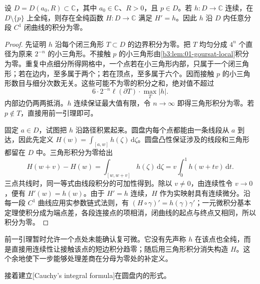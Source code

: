 \begin{lemma}\label{b3:lem:01-punctured-primitive}
设 \(D=D(a_0,R)\subset\mathbb C\)，其中 \(a_0\in\mathbb C\)、\(R>0\)，且 \(p\in D\)。若 \(h:D\to\mathbb C\) 连续，在 \(D\setminus\{p\}\) 上全纯，则存在全纯函数 \(H:D\to\mathbb C\) 满足 \(H'=h\)。因此 \(h\) 沿 \(D\) 内任意分段 \(C^1\) 闭曲线的积分为零。
\end{lemma}
\begin{proof}
先证明 \(h\) 沿每个闭三角形 \(T\subset D\) 的边界积分为零。把 \(T\) 均匀分成 \(4^n\) 个直径为原来 \(2^{-n}\) 的小三角形。不接触 \(p\) 的小三角形由\cref{b3:lem:01-goursat-local}积分为零。重复中点细分所得网格中，一个点若在小三角形内部，只属于一个闭三角形；若在边内，至多属于两个；若在顶点，至多属于六个。因而接触 \(p\) 的小三角形数目与细分次数无关。这些可能不为零的积分之和，绝对值不超过
\[
6\cdot2^{-n}\ell(\partial T)\cdot\max_T|h|.
\]
内部边仍两两抵消。\(h\) 连续保证最大值有限，令 \(n\to\infty\) 即得三角形积分为零。若 \(p\notin T\)，直接用前一引理即可。

固定 \(a\in D\)，试图把 \(h\) 沿路径积累起来。圆盘内每个点都能由一条线段从 \(a\) 到达，因此先定义 \(H(w)=\int_{[a,w]}h(\zeta)\,\mathrm{d}\zeta\)。圆盘凸性保证涉及的线段和三角形都留在 \(D\) 中。三角形积分为零给出
\[
H(w+v)-H(w)=\int_{[w,w+v]}h(\zeta)\,\mathrm{d}\zeta
=v\int_0^1h(w+tv)\,\mathrm{d}t.
\]
三点共线时，同一等式由线段积分的可加性得到。除以 \(v\neq0\)，由连续性令 \(v\to0\)，便有 \(H'(w)=h(w)\)。由于 \(H'=h\) 连续，\(H\) 作为实映射具有连续微分。沿每一段 \(C^1\) 曲线应用实参数链式法则，有 \((H\circ\gamma)'=h(\gamma)\gamma'\)；一元微积分基本定理使积分成为端点差，各段连接点的项相消，闭曲线的起点与终点又相同，所以积分为零。
\end{proof}

前一引理暂时允许一个点处未能确认复可微。它没有先声称 \(h\) 在该点也全纯，而是直接用连续性让接触该点的短边积分趋零；随后用三角形积分消失构造 \(H\)。这个余地使下一步能够处理差商在分母为零处的补定义。

\ProseParagraphBreak

接着建立[Cauchy's integral formula]在圆盘内的形式。


